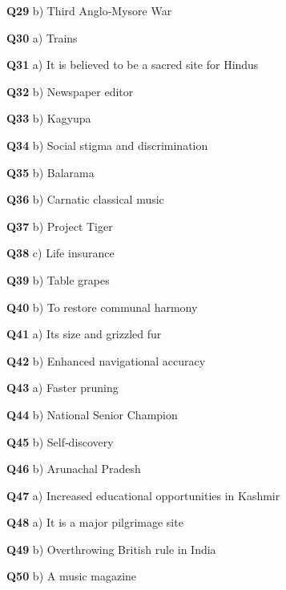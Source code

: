 \textbf{Q29} b) Third Anglo‑Mysore War\par
\textbf{Q30} a) Trains\par
\textbf{Q31} a) It is believed to be a sacred site for Hindus\par
\textbf{Q32} b) Newspaper editor\par
\textbf{Q33} b) Kagyupa\par
\textbf{Q34} b) Social stigma and discrimination\par
\textbf{Q35} b) Balarama\par
\textbf{Q36} b) Carnatic classical music\par
\textbf{Q37} b) Project Tiger\par
\textbf{Q38} c) Life insurance\par
\textbf{Q39} b) Table grapes\par
\textbf{Q40} b) To restore communal harmony\par
\textbf{Q41} a) Its size and grizzled fur\par
\textbf{Q42} b) Enhanced navigational accuracy\par
\textbf{Q43} a) Faster pruning\par
\textbf{Q44} b) National Senior Champion\par
\textbf{Q45} b) Self‑discovery\par
\textbf{Q46} b) Arunachal Pradesh\par
\textbf{Q47} a) Increased educational opportunities in Kashmir\par
\textbf{Q48} a) It is a major pilgrimage site\par
\textbf{Q49} b) Overthrowing British rule in India\par
\textbf{Q50} b) A music magazine\par